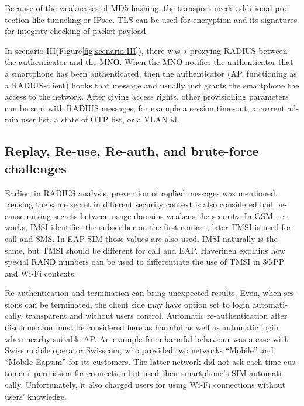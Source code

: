 \documentclass[12pt,a4paper,english]{tutthesis}
\begin{document}
\begin{otherlanguage}{english}
Because of the weaknesses of MD5 hashing, the transport needs additional protection
like tunneling or IPsec. TLS can be used for encryption and its
signatures for integrity checking of packet payload.





In scenario III(Figure\ref{fig:scenario-III}),  there was a proxying RADIUS
between the authenticator
and the MNO.  When the MNO notifies the authenticator
that a smartphone has been authenticated, then the authenticator (AP, functioning
as a RADIUS-client) hooks that message and usually just grants the
smartphone the access to the network. After giving access rights, other
provisioning parameters can be sent with RADIUS messages, for example
a session time-out,
a current admin user list, a state of OTP list, or a VLAN id.


\subsection{Replay, Re-use, Re-auth, and brute-force challenges}
\label{sec-6-1-5}

Earlier, in RADIUS analysis, prevention of replied messages was
mentioned. Reusing the same secret in different security context is also
considered bad because mixing secrets between usage
domains weakens the security.  In GSM networks, IMSI identifies the subscriber on
the first contact, later TMSI is used for call and SMS.  In EAP-SIM those
values are also used. IMSI naturally is the same, but TMSI should be
different for call and EAP.  Haverinen\cite{hav-doc} explains how
special RAND numbers can be used to differentiate the use of TMSI in 3GPP and Wi-Fi
contexts.

Re-authentication and termination can bring unexpected results.
Even, when sessions can be terminated, the client side may have 
option set to login automatically, transparent and without users control.
Automatic re-authentication after disconnection  must be considered
here as harmful as well as automatic login when nearby suitable AP. An
example from harmful behaviour was a case with  Swiss mobile operator Swisscom, who
 provided two networks ``Mobile'' and ``Mobile Eapsim''  for its
customers. 
The latter network did not ask each time customers' permission for
connection but used their smartphone's SIM
automatically. Unfortunately, it also charged users for using Wi-Fi
connections without users' knowledge.\cite{swisscom}




\end{otherlanguage}
\end{document}
